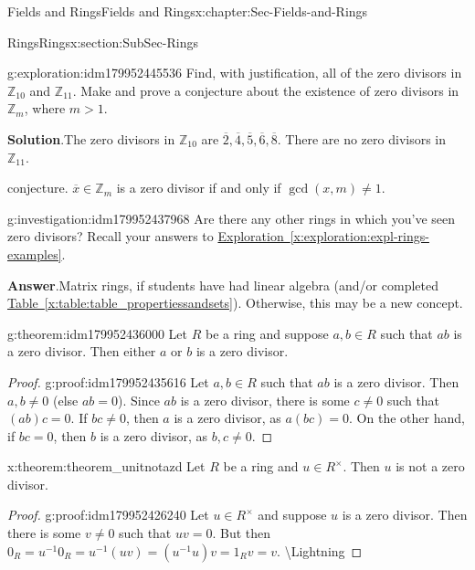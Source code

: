 \documentclass[oneside,10pt,]{book}
\newcommand{\blocktitlefont}{\relax}
\newcommand{\xreffont}{\relax}
\numberwithin{equation}{section}
\def\Z{{\mathbb Z}}
\begin{document}
\begin{chapterptx}{Fields and Rings}{}{Fields and Rings}{}{}{x:chapter:Sec-Fields-and-Rings}
\begin{sectionptx}{Rings}{}{Rings}{}{}{x:section:SubSec-Rings}
\begin{exploration}{}{g:exploration:idm179952445536}%
Find, with justification, all of the zero divisors in \(\Z_{10}\) and \(\Z_{11}\). Make and prove a conjecture about the existence of zero divisors in \(\Z_m\), where \(m > 1\).%
\par\smallskip%
\noindent\textbf{\blocktitlefont Solution}.\hypertarget{g:solution:idm179952440912}{}\quad{}The zero divisors in \(\Z_{10}\) are \(\overline{2}, \overline{4}, \overline{5}, \overline{6},\overline{8}\). There are no zero divisors in \(\Z_{11}\).%
\par
conjecture. \(\overline{x}\in \Z_m\) is a zero divisor if and only if \(\gcd(x,m) \ne 1\).%
\end{exploration}
\begin{investigation}{}{g:investigation:idm179952437968}%
Are there any other rings in which you've seen zero divisors? Recall your answers to \hyperref[x:exploration:expl-rings-examples]{Exploration~{\xreffont\ref{x:exploration:expl-rings-examples}}}.%
\par\smallskip%
\noindent\textbf{\blocktitlefont Answer}.\hypertarget{g:answer:idm179952436864}{}\quad{}Matrix rings, if students have had linear algebra (and\slash{}or completed \hyperref[x:table:table_propertiessandsets]{Table~{\xreffont\ref{x:table:table_propertiessandsets}}}). Otherwise, this may be a new concept.%
\end{investigation}
\begin{theorem}{}{}{g:theorem:idm179952436000}%
Let \(R\) be a ring and suppose \(a,b\in R\) such that \(ab\) is a zero divisor. Then either \(a\) or \(b\) is a zero divisor.%
\end{theorem}
\begin{proof}{}{g:proof:idm179952435616}
Let \(a,b\in R\) such that \(ab\) is a zero divisor. Then \(a,b\ne 0\) (else \(ab = 0\)). Since \(ab\) is a zero divisor, there is some \(c\ne 0\) such that \((ab) c = 0\). If \(bc\ne 0\), then \(a\) is a zero divisor, as \(a(bc) = 0\). On the other hand, if \(bc=0\), then \(b\) is a zero divisor, as \(b,c\ne 0\).%
\end{proof}
\begin{theorem}{}{}{x:theorem:theorem_unitnotazd}%
Let \(R\) be a ring and \(u\in R^\times\). Then \(u\) is not a zero divisor.%
\end{theorem}
\begin{proof}{}{g:proof:idm179952426240}
Let \(u\in R^\times\) and suppose \(u\) is a zero divisor. Then there is some \(v\ne 0\) such that \(uv = 0\). But then \(0_R = u^{-1} 0_R = u^{-1} (uv) = (u^{-1} u) v = 1_R v = v\). \textbackslash{}Lightning%

\end{proof}
\end{sectionptx}
\end{chapterptx}
\end{document}

